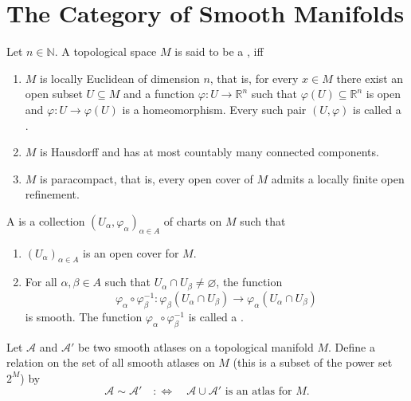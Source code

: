 \section*{The Category of Smooth Manifolds}

\begin{definition}
	Let $n \in \mathbb{N}$. A topological space $M$ is said to be a , iff
	\begin{enumerate}[label = \textup{(\roman*)},leftmargin=*]
		\item $M$ is locally Euclidean of dimension $n$, that is, for every $x \in M$ there exist an open subset $U \subseteq M$ and a function $\varphi : U \to \mathbb{R}^n$ such that $\varphi(U) \subseteq \mathbb{R}^n$ is open and $\varphi : U \to \varphi(U)$ is a homeomorphism. Every such pair $(U,\varphi)$ is called a .
		\item $M$ is Hausdorff and has at most countably many connected components.
		\item $M$ is paracompact, that is, every open cover of $M$ admits a locally finite open refinement.
	\end{enumerate}
\end{definition}

\begin{definition}
	A  is a collection $(U_\alpha,\varphi_\alpha)_{\alpha \in A}$ of charts on $M$ such that
	\begin{enumerate}[label = \textup{(\roman*)},leftmargin = *]
		\item $(U_\alpha)_{\alpha \in A}$ is an open cover for $M$.
		\item For all $\alpha,\beta \in A$ such that $U_\alpha \cap U_\beta \neq \varnothing$, the function 
			\begin{equation*}
				\varphi_\alpha \circ \varphi_\beta^{-1} : \varphi_\beta(U_\alpha \cap U_\beta) \to \varphi_\alpha(U_\alpha \cap U_\beta)
			\end{equation*}
			\noindent is smooth. The function $\varphi_\alpha \circ \varphi_\beta^{-1}$ is called a .
	\end{enumerate}
\end{definition}

Let $\mathcal{A}$ and $\mathcal{A}'$ be two smooth atlases on a topological manifold $M$. Define a relation on the set of all smooth atlases on $M$ (this is a subset of the power set $2^M$) by
\begin{equation*}
	\mathcal{A} \sim \mathcal{A}' \quad :\Leftrightarrow \quad \mathcal{A} \cup \mathcal{A}' \text{ is an atlas for } M.
\end{equation*}

